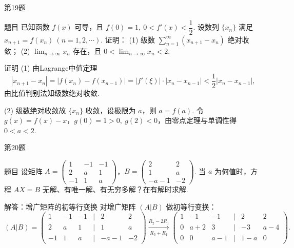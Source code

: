 \documentclass[aspectratio=169]{beamer}
\begin{document}
\begin{frame}{第19题}
\begin{block}{题目}
已知函数 \(f(x)\) 可导，且 \(f(0)=1,\ 0<f'(x)<\dfrac{1}{2}\). 设数列 \(\{x_{n}\}\) 满足 \(x_{n+1}=f(x_{n})\ (n=1,2,\cdots)\). 证明：
(1) 级数 \(\displaystyle\sum_{n=1}^{\infty}(x_{n+1}-x_{n})\) 绝对收敛；
(2) \(\displaystyle\lim_{n \to \infty} x_{n}\) 存在，且 \(0<\lim_{n \to \infty} x_{n}<2\).
\end{block}
\begin{block}{证明}
(1) 由Lagrange中值定理
\[|x_{n+1}-x_n|=|f(x_n)-f(x_{n-1})|=|f'(\xi)|\cdot|x_n-x_{n-1}|<\frac12|x_n-x_{n-1}|,\]
由比值判别法知级数绝对收敛.

(2) 级数绝对收敛故 \(\{x_n\}\) 收敛，设极限为 $a$，则 $a=f(a)$.
令 $g(x)=f(x)-x$，$g(0)=1>0,\ g(2)<0$，由零点定理与单调性得 $0<a<2$.
\end{block}
\end{frame}

\begin{frame}{第20题}
\begin{block}{题目}
设矩阵 \(A=\begin{pmatrix}1&-1&-1\\2&a&1\\-1&1&a\end{pmatrix}\)，\(B=\begin{pmatrix}2&2\\1&a\\-a-1&-2\end{pmatrix}\). 当 $a$ 为何值时，方程 \(AX=B\) 无解、有唯一解、有无穷多解？在有解时求解.
\end{block}

\begin{block}{解答：增广矩阵的初等行变换}
对增广矩阵 \((A|B)\) 做初等行变换：
\[
(A|B) = \begin{pmatrix}
1 & -1 & -1 & \vert & 2 & 2 \\
2 & a & 1 & \vert & 1 & a \\
-1 & 1 & a & \vert & -a-1 & -2
\end{pmatrix}\xrightarrow[R_3+R_1]{R_2-2R_1} \begin{pmatrix}
1 & -1 & -1 & \vert & 2 & 2 \\
0 & a+2 & 3 & \vert & -3 & a-4 \\
0 & 0 & a-1 & \vert & 1-a & 0
\end{pmatrix}.
\]
\end{block}
\end{frame}
\end{document}
